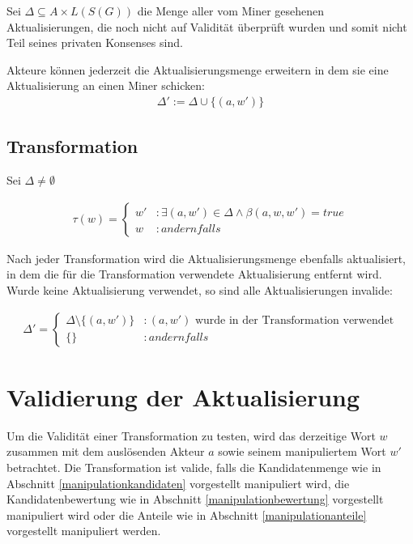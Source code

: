 \documentclass[a4paper,12pt]{report}
\begin{document}
Sei $\Delta \subseteq A\times L(S(G))$ die Menge aller vom Miner gesehenen Aktualisierungen, die noch nicht auf Validität überprüft wurden und somit nicht Teil seines privaten Konsenses sind.


Akteure können jederzeit die Aktualisierungsmenge erweitern in dem sie eine Aktualisierung an einen Miner schicken: 
\begin{eqnarray}
\Delta' := \Delta \cup \{(a,w')\}
\end{eqnarray}


\subsection{Transformation}
Sei $\Delta \neq \emptyset$ 

\begin{eqnarray}
  \tau( w ) = 
  \begin{cases}
    w'  &: \exists (a,w') \in \Delta \land \beta(a,w,w') = true \\
    w   &: andernfalls 
  \end{cases}
\end{eqnarray}

Nach jeder Transformation wird die Aktualisierungsmenge ebenfalls aktualisiert, in dem die für die Transformation verwendete Aktualisierung entfernt wird. Wurde keine Aktualisierung verwendet, so sind alle Aktualisierungen invalide:

\begin{eqnarray}
  \Delta' = 
  \begin{cases}
    \Delta\setminus \{ (a, w' )\} &: (a,w')\text{ wurde in der Transformation verwendet} \\
    \{\} &: andernfalls
  \end{cases}
\end{eqnarray}


\section{Validierung der Aktualisierung}
\label{transvalid}

Um die Validität einer Transformation zu testen, wird das derzeitige Wort $w$ zusammen mit dem auslösenden Akteur $a$ sowie seinem manipuliertem Wort $w'$ betrachtet. Die Transformation ist valide, falls die Kandidatenmenge wie in Abschnitt \ref{manipulationkandidaten} vorgestellt manipuliert wird, die Kandidatenbewertung wie in Abschnitt \ref{manipulationbewertung} vorgestellt manipuliert wird oder die Anteile wie in Abschnitt \ref{manipulationanteile} vorgestellt manipuliert werden.
\end{document}
